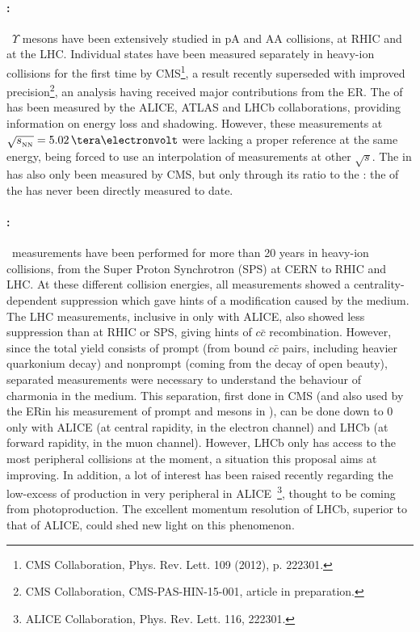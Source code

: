 \documentclass[a4paper,11pt]{article}
\newcommand{\ER}{ER}
\begin{document}
\paragraph{\PgUabc:\ }\ 
$\Upsilon$ mesons have been extensively studied in pA and AA collisions, at RHIC and at the LHC. Individual
\PgUabc states have been measured separately in heavy-ion collisions for the first time by CMS\footnote{CMS Collaboration, Phys. Rev. Lett. 109 (2012), p. 222301. },
a result recently superseded with improved precision\footnote{CMS Collaboration, CMS-PAS-HIN-15-001, article in preparation.}, an analysis having received major contributions from the \ER. The \rpa of \PgUa has been measured by the ALICE, ATLAS and LHCb collaborations, providing information on energy loss and shadowing. However,
these measurements at $\sqrtsnn = 5.02\,\TeV$ were lacking a proper \pp reference at the same energy, being forced to use an interpolation of measurements at other
$\sqrt{s}$. The \PgUc in \ppb has also only been measured by CMS, but only through its ratio to the \PgUa: the \rpa of the \PgUc has never been directly measured to date.

\paragraph{\Jpsi:\ }\ 
\Jpsi measurements have been performed for more than 20 years in heavy-ion collisions, from the Super Proton Synchrotron (SPS) at CERN to RHIC and LHC. 
At these different collision energies, all measurements showed a centrality-dependent suppression
which gave hints of a modification caused by the medium. The LHC measurements, inclusive in \pt only with ALICE, also showed less
suppression than at RHIC or SPS, giving hints of $c\bar{c}$ recombination. However, since the total \Jpsi yield 
consists of prompt \Jpsi (from bound $c\bar{c}$ pairs, including heavier quarkonium decay) and nonprompt \Jpsi (coming
from the decay of open beauty), separated measurements were necessary to understand the behaviour of charmonia in the medium. 
This separation, first done in CMS (and also used by the \ER in his measurement of prompt \Jpsi and \psiP mesons in \pbpb), can be done down to 0 \pt only with ALICE (at central rapidity, in the electron channel) and LHCb (at forward rapidity, in the muon channel).
However, LHCb only has access to the most peripheral \pbpb collisions at the moment, a situation this proposal aims at improving. In addition, a lot of interest has been
raised recently regarding the low-\pt excess of \Jpsi production in very peripheral \pbpb in ALICE~\footnote{ALICE Collaboration, Phys. Rev. Lett. 116, 222301.}, thought to be coming from photoproduction. The 
excellent momentum resolution of LHCb, superior to that of ALICE, could shed new light on this phenomenon.
\end{document}
